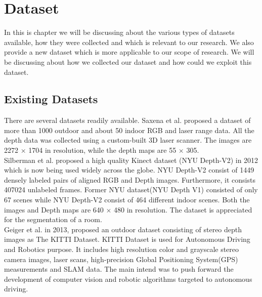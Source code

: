 

\chapter{Dataset}

\label{Chapter4:Dataset} 


In this is chapter we will be discussing about the various types of datasets available, how they were collected and which is relevant to our research. We also provide a new dataset which is more applicable to our scope of research. We will be discussing about how we collected our dataset and how could we exploit this dataset.


\section{Existing Datasets}
There are several datasets readily available. Saxena et al. \cite{saxena2006learning} proposed a dataset of more than 1000 outdoor and about 50 indoor RGB and laser range data. All the depth data was collected using a custom-built 3D laser scanner. The images are 2272 $\times$ 1704 in resolution, while the depth maps are 55 $\times$ 305.\\

Silberman et al. \cite{Silberman:ECCV12} proposed a high quality Kinect dataset (NYU Depth-V2) in 2012 which is now being used widely across the globe. NYU Depth-V2 \cite{Silberman:ECCV12} consist of 1449 densely labeled pairs of aligned RGB and Depth images. Furthermore, it consists 407024 unlabeled frames. Former NYU dataset(NYU Depth V1) \cite{silberman11indoor} consisted of only 67 scenes while NYU Depth-V2 consist of 464 different indoor scenes. Both the images and Depth maps are 640 $\times$ 480 in resolution. The dataset is appreciated for the segmentation of a room.\\

Geiger et al. \cite{Geiger2013IJRR} in 2013, proposed an outdoor dataset consisting of stereo depth images as The KITTI Dataset. KITTI Dataset is used for Autonomous Driving and Robotics purpose. It includes high resolution color and grayscale stereo camera images, laser scans, high-precision Global Positioning System(GPS) measurements and SLAM data. The main intend was to push forward the development of computer vision and robotic algorithms targeted to autonomous driving.\\

